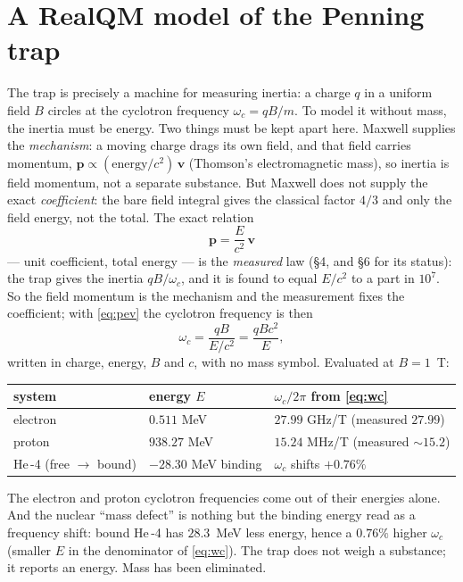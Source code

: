\documentclass[11pt]{article}
\begin{document}
\section{A RealQM model of the Penning trap}
The trap is precisely a machine for measuring inertia: a charge $q$ in a uniform field $B$ circles at the
cyclotron frequency $\omega_c=qB/m$. To model it without mass, the inertia must be energy. Two things must be kept
apart here. Maxwell supplies the \emph{mechanism}: a moving charge drags its own field, and that field carries
momentum, $\mathbf p\propto(\text{energy}/c^2)\,\mathbf v$ (Thomson's electromagnetic mass), so inertia is field
momentum, not a separate substance. But Maxwell does not supply the exact \emph{coefficient}: the bare field
integral gives the classical factor $4/3$ and only the field energy, not the total. The exact relation
\begin{equation}
\mathbf p=\frac{E}{c^2}\,\mathbf v
\label{eq:pev}
\end{equation}
--- unit coefficient, total energy --- is the \emph{measured} law (\S4, and \S6 for its status): the trap gives
the inertia $qB/\omega_c$, and it is found to equal $E/c^2$ to a part in $10^{7}$. So the field momentum is the
mechanism and the measurement fixes the coefficient; with \eqref{eq:pev} the cyclotron frequency is then
\begin{equation}
\omega_c=\frac{qB}{E/c^2}=\frac{qBc^2}{E},
\label{eq:wc}
\end{equation}
written in charge, energy, $B$ and $c$, with no mass symbol. Evaluated at $B=1$~T:
\begin{center}
\begin{tabular}{lll}
\hline
system & energy $E$ & $\omega_c/2\pi$ from \eqref{eq:wc} \\
\hline
electron & $0.511$ MeV & $27.99$ GHz/T \quad(measured $27.99$)\\
proton   & $938.27$ MeV & $15.24$ MHz/T \quad(measured $\sim15.2$)\\
He\,-4 (free $\to$ bound) & $-28.30$ MeV binding & $\omega_c$ shifts $+0.76\%$ \\
\hline
\end{tabular}
\end{center}
The electron and proton cyclotron frequencies come out of their energies alone. And the nuclear ``mass defect''
is nothing but the binding energy read as a frequency shift: bound He\,-4 has $28.3$~MeV less energy, hence a
$0.76\%$ higher $\omega_c$ (smaller $E$ in the denominator of \eqref{eq:wc}). The trap does not weigh a substance;
it reports an energy. Mass has been eliminated.
\end{document}
